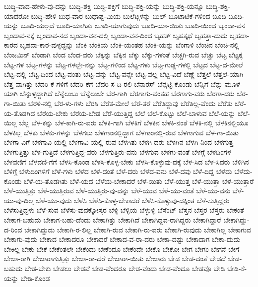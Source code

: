 {ಬುದ್ಧಿ-ವಾದ-ಹೇಳು-ವು-ದನ್ನು
ಬುದ್ಧಿ-ಶಕ್ತಿ
ಬುದ್ಧಿ-ಶಕ್ತಿಗೆ
ಬುದ್ಧಿ-ಶಕ್ತಿ-ಯನ್ನು
ಬುದ್ಧಿ-ಶಕ್ತಿ-ಯನ್ನೂ
ಬುದ್ಧಿ-ಶಕ್ತಿ-ಯಾದರೋ
ಬುದ್ಧಿ-ಹೇಳಿ
ಬುಧ-ವಾರ
ಬುಧಾಷ್ಟ-ಮಿಯ
ಬುಲೆಟ್ಗಳನ್ನು
ಬುಲ್
ಬೂಟಾಟಿಕೆ-ಗಳಿಂದ
ಬೂದಿ
ಬೂದಿ-ಯನ್ನು
ಬೂದಿ-ಯಲ್ಲದೆ
ಬೂದಿ-ಯಾಗಿತ್ತು
ಬೂದಿ-ಯಾಗುವುದು
ಬೂದಿ-ಯಾ-ಯಿತು
ಬೂದಿ-ಯಿಂದ
ಬೃಂದಾ-ವನ
ಬೃಂದಾವ-ನಕ್ಕೆ
ಬೃಂದಾವ-ನದ
ಬೃಂದಾ-ವನ-ದಲ್ಲಿ
ಬೃಂದಾ-ವನ-ದಿಂದ
ಬೃಹತ್
ಬೃಹತ್ಕಥೆ
ಬೃಹತ್ತಾ-ದುದು
ಬೃಹದಾ-ಕಾರದ
ಬೃಹದಾ-ಕಾರ-ವುಳ್ಳದ್ದನ್ನು
ಬೆಂಕಿ
ಬೆಂಕಿಯ
ಬೆಂಕಿ-ಯಂತಹ
ಬೆಂಕಿ-ಯನ್ನು
ಬೆಂಗಾಳಿ
ಬೆಂಚಿನ
ಬೆಂಚಿ-ನಲ್ಲಿ
ಬೆಂಜಮಿನ್
ಬೆಂಡಾಗಿ
ಬೆಂದ
ಬೆಂದ-ವರು
ಬೆಕ್ಕನ್ನು
ಬೆಕ್ಕಿನ
ಬೆಕ್ಕು
ಬೆಕ್ಕು-ಗಳಂತೆ
ಬೆಚ್ಚಗಿ-ರುವ
ಬೆಚ್ಚು
ಬೆಟ್ಟ
ಬೆಟ್ಟಕ್ಕೆ
ಬೆಟ್ಟ-ಗಳ
ಬೆಟ್ಟ-ಗಳನ್ನು
ಬೆಟ್ಟ-ಗಳಲ್ಲೇ-ನನ್ನು
ಬೆಟ್ಟ-ಗಳಿಂದ
ಬೆಟ್ಟ-ಗಳು
ಬೆಟ್ಟ-ಗುಡ್ಡ-ಗಳಲ್ಲಿ
ಬೆಟ್ಟದ
ಬೆಟ್ಟ-ದ-ಮೇಲೆ
ಬೆಟ್ಟ-ದಲ್ಲಿ
ಬೆಟ್ಟ-ದಿಂದ
ಬೆಟ್ಟ-ವಂತು
ಬೆಟ್ಟ-ವನ್ನು
ಬೆಟ್ಟ-ವನ್ನೇ
ಬೆಟ್ಟ-ವಲ್ಲ
ಬೆಟ್ಟ-ವಿದೆ
ಬೆಣ್ಣೆ
ಬೆತ್ತಲೆ
ಬೆತ್ತಲೆ-ಯಾಗಿ
ಬೆತ್ತ-ವಾಗಿತ್ತು
ಬೆದರಿ-ಕೆ-ಗಳಿಗೆ
ಬೆದರಿ-ಕೆಗೆ
ಬೆದರಿ-ಸ-ದಿ-ರಲಿ
ಬೆನಾರಸ್
ಬೆನ್ನಟ್ಟಿ-ಕೊಂಡು
ಬೆನ್ನಿಗೆ
ಬೆನ್ನು-ಮೂಳೆ-ಯಾಗಿ
ಬೆನ್ನುಳ್ಳದ್ದಾಗಿದೆ
ಬೆನ್ನೆಲುಬು
ಬೆನ್ನೆಲುಬೇ
ಬೆರ-ಗಾಗಿ
ಬೆರಗಾಗು-ವಂತಹ
ಬೆರಗಾಗು-ವರು
ಬೆರಗಾ-ದರು
ಬೆರ-ಗಾ-ಯಿತು
ಬೆರಳಿ-ನಲ್ಲಿ
ಬೆರ-ಳು-ಗಳು
ಬೆರಸಿ
ಬೆರೆತ-ಮೇಲೆ
ಬೆರೆ-ತರೆ
ಬೆರೆತಿದ್ದುವು
ಬೆರೆತಿಲ್ಲ-ವೆಂದು
ಬೆರೆತು
ಬೆರೆ-ಯ-ತೊಡಗಿದ
ಬೆರೆಯ-ಬೇಕು
ಬೆರೆಯ-ಬೇಡ
ಬೆರೆ-ಯುತ್ತಿದ್ದ
ಬೆಲೆ
ಬೆಲೆ-ಕೊಟ್ಟು
ಬೆಲೆ-ಬಾಳುವ
ಬೆಲೆ-ಯನ್ನು
ಬೆಲೆ-ಯಿಲ್ಲ
ಬೆಲ್ಲ
ಬೆಳ-ಕನ್ನು
ಬೆಳ-ಕಾಗಿ-ರು-ವರು
ಬೆಳಕಿ-ಗಾಗಿ
ಬೆಳಕಿಗೆ
ಬೆಳಕಿನ
ಬೆಳಕಿ-ನಂತೆ
ಬೆಳಕಿ-ನಲ್ಲಿ
ಬೆಳಕಿನಲ್ಲಿಯೂ
ಬೆಳಕಿಲ್ಲ
ಬೆಳಕು
ಬೆಳಕು-ಗಳನ್ನು
ಬೆಳಗಲು
ಬೆಳಗಾಂನಲ್ಲಿದ್ದಾಗ
ಬೆಳಗಾಂನಲ್ಲಿ-ರುವ
ಬೆಳಗಾಗುವ
ಬೆಳ-ಗಾ-ಯಿತು
ಬೆಳಗಾ-ವಿಗೆ
ಬೆಳಗಾವಿ-ಯಲ್ಲಿ
ಬೆಳಗಾವಿ-ಯಲ್ಲಿ-ರುವ
ಬೆಳಗಿತು
ಬೆಳಗಿ-ದರು
ಬೆಳಗಿನ
ಬೆಳಗಿ-ನಿಂದ
ಬೆಳಗುತ್ತ
ಬೆಳಗುತ್ತಿತ್ತು
ಬೆಳ-ಗುತ್ತಿದೆ
ಬೆಳಗುತ್ತಿದ್ದ-ವರು
ಬೆಳಗುತ್ತಿರು-ವನು
ಬೆಳಗುವ
ಬೆಳಗು-ವಂತೆ
ಬೆಳಗ್ಗೆ
ಬೆಳದಿಂಗಳ
ಬೆಳವಣಿಗೆ
ಬೆಳವಣಿ-ಗೆಗೆ
ಬೆಳಸಿ-ಕೊಂಡ
ಬೆಳಸಿ-ಕೊಳ್ಳ-ಬೇಕು
ಬೆಳಸಿ-ಕೊಳ್ಳುವು-ದಕ್ಕೆ
ಬೆಳ-ಸಿದ
ಬೆಳ-ಸಿದರು
ಬೆಳಿಗಿನ
ಬೆಳಿಗ್ಗೆ
ಬೆಳುದಿಂಗಳಿಗೆ
ಬೆಳೆ-ಗಳು
ಬೆಳೆದ
ಬೆಳೆ-ದಂತೆ
ಬೆಳೆ-ದರು
ಬೆಳೆದ-ವನು
ಬೆಳೆ-ದವು
ಬೆಳೆ-ದಿದ್ದ
ಬೆಳೆದು
ಬೆಳೆದು-ಕೊಂಡು
ಬೆಳೆ-ಯ-ತೊಡಗಿತು
ಬೆಳೆ-ಯದ
ಬೆಳೆಯ-ಬೇಕಾದರೆ
ಬೆಳೆ-ಯಿತು
ಬೆಳೆ-ಯುತ್ತ
ಬೆಳೆ-ಯುತ್ತಾ
ಬೆಳೆ-ಯುತ್ತಾರೆ
ಬೆಳೆ-ಯುತ್ತಿತ್ತು
ಬೆಳೆ-ಯುತ್ತಿರುವ
ಬೆಳೆ-ಯುತ್ತಿರು-ವು-ದನ್ನು
ಬೆಳೆ-ಯುವ
ಬೆಳೆ-ಯು-ವಂತೆ
ಬೆಳೆ-ಯು-ವನು
ಬೆಳೆ-ಯು-ವು-ದಿಲ್ಲ
ಬೆಳೆ-ಯು-ವುದು
ಬೆಳೆಸಿ
ಬೆಳೆಸಿ-ಕೊಳ್ಳ-ಬೇಕಾದರೆ
ಬೆಳೆಸಿ-ಕೊಳ್ಳುವು-ದಕ್ಕಿಂತ
ಬೆಳೆ-ಸುತ್ತಿದ್ದರು
ಬೆಳೆಸುತ್ತಿದ್ದಳು
ಬೆಳೆ-ಸುವ
ಬೆಳೆಸು-ವುದಕ್ಕೋಸ್ಕರ
ಬೆಳ್ಳಿ
ಬೆಳ್ಳಿಯ
ಬೆಳ್ಳುಳ್ಳಿ
ಬೆಸೆಂಟ್
ಬೆಸ್ತನ
ಬೆಸ್ತರ
ಬೆಸ್ತರು
ಬೇಕಂತೆ
ಬೇಕಾಗ-ಬಹುದು
ಬೇಕಾಗ-ಬಹು-ದೆಂದು
ಬೇಕಾಗಿತ್ತು
ಬೇಕಾಗಿದೆ
ಬೇಕಾಗಿದ್ದವ-ರಾಗಿದ್ದರು
ಬೇಕಾಗಿದ್ದಾರೆ
ಬೇಕಾಗಿದ್ದು-ದ-ರಿಂದ
ಬೇಕಾಗಿದ್ದುದು
ಬೇಕಾಗಿ-ರ-ಲಿಲ್ಲ
ಬೇಕಾಗಿ-ರುವ
ಬೇಕಾಗಿ-ರು-ವರು
ಬೇಕಾಗಿ-ರುವುದು
ಬೇಕಾಗಿಲ್ಲ
ಬೇಕಾಗುವ
ಬೇಕಾಗು-ವುದು
ಬೇಕಾದ
ಬೇಕಾದರೂ
ಬೇಕಾದರೆ
ಬೇಕಾದ-ವ-ರಾ-ದರು
ಬೇಕಾ-ದಷ್ಟು
ಬೇಕಾದಾಗ
ಬೇಕಾ-ದುದು
ಬೇಕಿಲ್ಲ
ಬೇಕು
ಬೇಕೆ
ಬೇಕೆಂತಲೇ
ಬೇಕೆಂದು
ಬೇಕೆಂದೂ
ಬೇಕೆಂದೇ
ಬೇಕೊ
ಬೇಕೋ
ಬೇಗ
ಬೇಗಂ
ಬೇಗನೆ
ಬೇಗೆ
ಬೇಜಾ-ರಾಗಿ
ಬೇಜಾರಾಗುತ್ತಿತ್ತು
ಬೇಜಾ-ರಾ-ದರೆ
ಬೇಜಾರಾ-ಯಿತು
ಬೇಜಾರು
ಬೇಡ
ಬೇಡ-ದಂತೆ
ಬೇಡದೆ
ಬೇಡ-ಬಹುದು
ಬೇಡ-ಬೇಕು
ಬೇಡಲು
ಬೇಡವೆ
ಬೇಡ-ವೆಂದರೂ
ಬೇಡ-ವೆಂದು
ಬೇಡ-ವೆಂದೂ
ಬೇಡವೊ
ಬೇಡಿ
ಬೇಡಿ-ಕೆ-ಯನ್ನು
ಬೇಡಿ-ಕೊಂಡ
}
